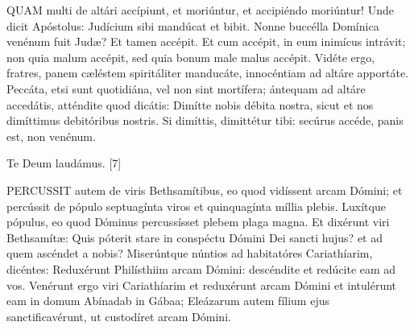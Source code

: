 \lettrine[lines=2]{Q}{UAM} multi de altári accípiunt, et moriúntur, et accipiéndo moriúntur! Unde dicit Apóstolus: Judícium sibi mandúcat et bibit. Nonne buccélla Domínica venénum fuit Judæ? Et tamen accépit. Et cum accépit, in eum inimícus intrávit; non quia malum accépit, sed quia bonum male malus accépit. Vidéte ergo, fratres, panem cæléstem spiritáliter manducáte, innocéntiam ad altáre apportáte. Peccáta, etsi sunt quotidiána, vel non sint mortífera; ántequam ad altáre accedátis, atténdite quod dicátis: Dimítte nobis débita nostra, sicut et nos dimíttimus debitóribus nostris. Si dimíttis, dimittétur tibi: secúrus accéde, panis est, non venénum.

Te Deum laudámus. [7]






\lettrine[lines=2]{P}{ERCUSSIT} autem de viris Bethsamítibus, eo quod vidíssent arcam Dómini; et percússit de pópulo septuagínta viros et quinquagínta míllia plebis. Luxítque pópulus, eo quod Dóminus percussísset plebem plaga magna. Et dixérunt viri Bethsamítæ: Quis póterit stare in conspéctu Dómini Dei sancti hujus? et ad quem ascéndet a nobis? Miserúntque núntios ad habitatóres Cariathíarim, dicéntes: Reduxérunt Philísthiim arcam Dómini: descéndite et redúcite eam ad vos. Venérunt ergo viri Cariathíarim et reduxérunt arcam Dómini et intulérunt eam in domum Abínadab in Gábaa; Eleázarum autem fílium ejus sanctificavérunt, ut custodíret arcam Dómini.

